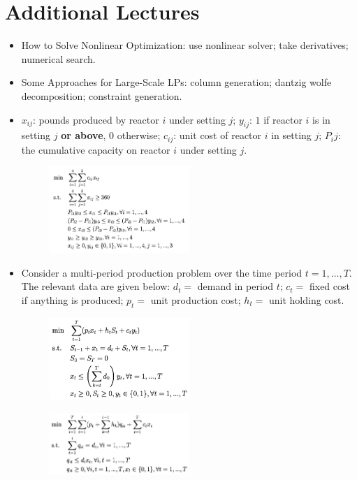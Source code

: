\documentclass[10pt, twocolumn]{article}
\begin{document}
\section*{Additional Lectures}
\begin{itemize}
\item How to Solve Nonlinear Optimization: use nonlinear solver; take derivatives; numerical search.
\item Some Approaches for Large-Scale LPs: column generation; dantzig wolfe decomposition; constraint generation.
\item $x_{ij}$: pounds produced by reactor $i$ under setting $j$;
$y_{ij}$: $1$ if reactor $i$ is in setting $j$ \textbf{or above}, $0$ otherwise;
$c_{ij}$: unit cost of reactor $i$ in setting $j$;
$P_ij$: the cumulative capacity on reactor $i$ under setting $j$.
\begin{figure}[!h]
\centering
\includegraphics[width=0.5\textwidth]{eg1}
\end{figure}
\item Consider a multi-period production problem over the time period $t = 1,\dots,T$. The relevant data are given below: $d_t=$ demand in period $t$; $c_t=$ fixed cost if anything is produced; $p_t=$ unit production cost; $h_t=$ unit holding cost.
\begin{figure}[!h]
\centering
\includegraphics[width=0.5\textwidth]{eg2}
\end{figure}
\begin{figure}[!h]
\centering
\includegraphics[width=0.5\textwidth]{eg3}

\end{figure}
\end{itemize}
\end{document}
